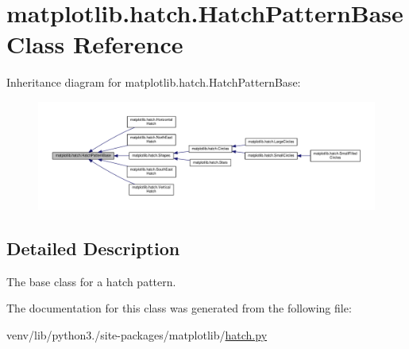 \hypertarget{classmatplotlib_1_1hatch_1_1HatchPatternBase}{}\section{matplotlib.\+hatch.\+Hatch\+Pattern\+Base Class Reference}
\label{classmatplotlib_1_1hatch_1_1HatchPatternBase}


Inheritance diagram for matplotlib.\+hatch.\+Hatch\+Pattern\+Base\+:
\nopagebreak
\begin{figure}[H]
\begin{center}
\leavevmode
\includegraphics[width=350pt]{classmatplotlib_1_1hatch_1_1HatchPatternBase__inherit__graph}
\end{center}
\end{figure}


\subsection{Detailed Description}
\begin{DoxyVerb}The base class for a hatch pattern.\end{DoxyVerb}
 

The documentation for this class was generated from the following file\+:\begin{DoxyCompactItemize}
\item 
venv/lib/python3./site-\/packages/matplotlib/\hyperlink{hatch_8py}{hatch.\+py}\end{DoxyCompactItemize}

